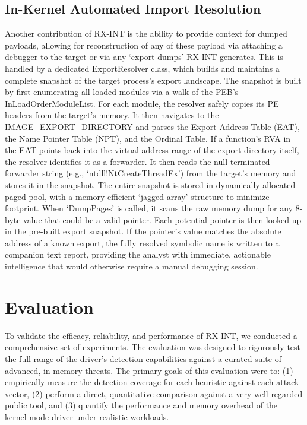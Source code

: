 \documentclass[journal]{IEEEtran}
\begin{document}
\subsection{In-Kernel Automated Import Resolution}
Another contribution of RX-INT is the ability to provide context for dumped payloads, allowing for reconstruction of any of these payload via attaching a debugger to the target or via any `export dumps' RX-INT generates. This is handled by a dedicated ExportResolver class, which builds and maintains a complete snapshot of the target process's export landscape.
The snapshot is built by first enumerating all loaded modules via a walk of the PEB's InLoadOrderModuleList. For each module, the resolver safely copies its PE headers from the target's memory. It then navigates to the IMAGE\_EXPORT\_DIRECTORY and parses the Export Address Table (EAT), the Name Pointer Table (NPT), and the Ordinal Table.
If a function's RVA in the EAT points back into the virtual address range of the export directory itself, the resolver identifies it as a forwarder. It then reads the null-terminated forwarder string (e.g., `ntdll!NtCreateThreadEx') from the target's memory and stores it in the snapshot. The entire snapshot is stored in dynamically allocated paged pool, with a memory-efficient `jagged array' structure to minimize footprint.
When `DumpPages' is called, it scans the raw memory dump for any 8-byte value that could be a valid pointer. Each potential pointer is then looked up in the pre-built export snapshot. If the pointer's value matches the absolute address of a known export, the fully resolved symbolic name is written to a companion text report, providing the analyst with immediate, actionable intelligence that would otherwise require a manual debugging session.

\section{Evaluation}
\label{sec:evaluation}
To validate the efficacy, reliability, and performance of RX-INT, we conducted a comprehensive set of experiments. The evaluation was designed to rigorously test the full range of the driver's detection capabilities against a curated suite of advanced, in-memory threats. The primary goals of this evaluation were to: (1) empirically measure the detection coverage for each heuristic against each attack vector, (2) perform a direct, quantitative comparison against a very well-regarded public tool, and (3) quantify the performance and memory overhead of the kernel-mode driver under realistic workloads.
\end{document}

